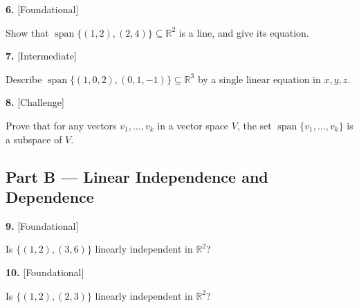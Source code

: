 \documentclass[11pt]{article}
\begin{document}
\begin{minipage}{\linewidth}\textbf{6.} \hfill{\scriptsize\color{ink}[Foundational]}\par\nopagebreak Show that $\operatorname{span}\{(1,2),(2,4)\}\subseteq\mathbb{R}^{2}$ is a line, and give its equation.
\vspace{3.4cm}\end{minipage}\par\vspace{4pt}
\begin{minipage}{\linewidth}\textbf{7.} \hfill{\scriptsize\color{ink}[Intermediate]}\par\nopagebreak Describe $\operatorname{span}\{(1,0,2),(0,1,-1)\}\subseteq\mathbb{R}^{3}$ by a single linear equation in $x,y,z$.
\vspace{4.0cm}\end{minipage}\par\vspace{4pt}
\begin{minipage}{\linewidth}\textbf{8.} \hfill{\scriptsize\color{ink}[Challenge]}\par\nopagebreak Prove that for any vectors $v_1,\dots,v_k$ in a vector space $V$, the set $\operatorname{span}\{v_1,\dots,v_k\}$ is a subspace of $V$.
\vspace{5.0cm}\end{minipage}\par\vspace{4pt}
\subsection*{\normalsize\color{ink} Part B --- Linear Independence and Dependence}
\begin{minipage}{\linewidth}\textbf{9.} \hfill{\scriptsize\color{ink}[Foundational]}\par\nopagebreak Is $\{(1,2),(3,6)\}$ linearly independent in $\mathbb{R}^{2}$?
\vspace{2.6cm}\end{minipage}\par\vspace{4pt}
\begin{minipage}{\linewidth}\textbf{10.} \hfill{\scriptsize\color{ink}[Foundational]}\par\nopagebreak Is $\{(1,2),(2,3)\}$ linearly independent in $\mathbb{R}^{2}$?
\vspace{3.0cm}\end{minipage}\par\vspace{4pt}
\end{document}

